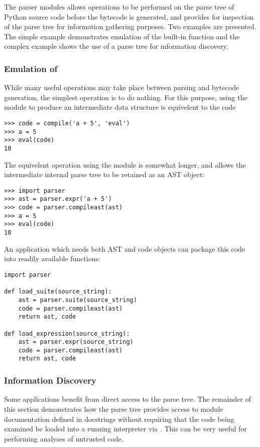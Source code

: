 The parser modules allows operations to be performed on the parse tree
of Python source code before the bytecode is generated, and provides
for inspection of the parse tree for information gathering purposes.
Two examples are presented.  The simple example demonstrates emulation
of the  built-in function and
the complex example shows the use of a parse tree for information
discovery.

\subsubsection{Emulation of }

While many useful operations may take place between parsing and
bytecode generation, the simplest operation is to do nothing.  For
this purpose, using the  module to produce an
intermediate data structure is equivelent to the code

\begin{verbatim}
>>> code = compile('a + 5', 'eval')
>>> a = 5
>>> eval(code)
10
\end{verbatim}
%
The equivelent operation using the  module is somewhat
longer, and allows the intermediate internal parse tree to be retained
as an AST object:

\begin{verbatim}
>>> import parser
>>> ast = parser.expr('a + 5')
>>> code = parser.compileast(ast)
>>> a = 5
>>> eval(code)
10
\end{verbatim}
%
An application which needs both AST and code objects can package this
code into readily available functions:

\begin{verbatim}
import parser

def load_suite(source_string):
    ast = parser.suite(source_string)
    code = parser.compileast(ast)
    return ast, code

def load_expression(source_string):
    ast = parser.expr(source_string)
    code = parser.compileast(ast)
    return ast, code
\end{verbatim}
%
\subsubsection{Information Discovery}

Some applications benefit from direct access to the parse tree.  The
remainder of this section demonstrates how the parse tree provides
access to module documentation defined in docstrings without requiring
that the code being examined be loaded into a running interpreter via
.  This can be very useful for performing analyses of
untrusted code.

